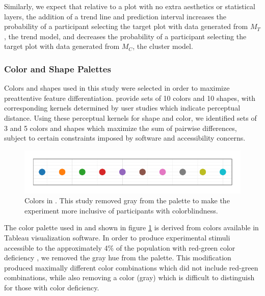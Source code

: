 \documentclass[11pt]{isuthesis}\usepackage[]{graphicx}\usepackage[]{color}
\newenvironment{knitrout}{}{} %
\begin{document}
Similarly, we expect that relative to a plot with no extra aesthetics or statistical layers, the addition of a trend line and prediction interval  increases the probability of a participant selecting the target plot with data generated from $M_T$, the trend model, and decreases the probability of a participant selecting the target plot with data generated from $M_C$, the cluster model.

\subsubsection{Color and Shape Palettes}
Colors and shapes used in this study were selected in order to maximize preattentive feature differentiation. \citet{heer:2014} provide sets of 10 colors and 10 shapes, with corresponding kernels determined by user studies which indicate perceptual distance. Using these perceptual kernels for shape and color, we identified sets of 3 and 5 colors and shapes which maximize the sum of pairwise differences, subject to certain constraints imposed by software and accessibility concerns. 

\begin{figure}[ht]\centering
\begin{knitrout}
\color{fgcolor}

{\centering \includegraphics[width=.5\linewidth]{Figure/FeatureHierarchy/fig-color-palette-1} 

}



\end{knitrout}
\caption[Color palette used to maximize preattentive perception]{Colors in \protect\citet{heer:2014}. This study removed gray from the palette to make the experiment more inclusive of participants with colorblindness.\label{fig:colors}}
\end{figure}

The color palette used in \citet{heer:2014} and shown in figure \ref{fig:colors} is derived from colors available in Tableau visualization software\citep{tableau}. 
In order to produce experimental stimuli accessible to the approximately 4\% of the population with red-green color deficiency \citep{colorvision}, we removed the gray hue from the palette. This modification produced maximally different color combinations which did not include red-green combinations, while also removing a color (gray) which is difficult to distinguish for those with color deficiency.  
\end{document}
